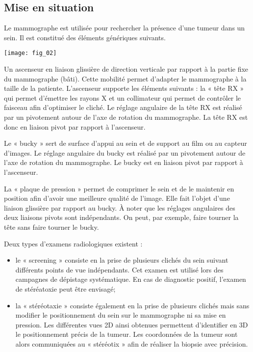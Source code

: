 \begin{multicols}{2}


\section*{Mise en situation}



Le mammographe est utilisée pour rechercher la présence d’une tumeur dans un sein. Il est constitué des éléments génériques suivants.

\begin{center}
\texttt{[image: fig\_02]}
\end{center}


Un ascenseur en liaison glissière de direction verticale par rapport à la partie fixe du mammographe (bâti). Cette mobilité permet d’adapter le mammographe à la taille de la patiente. L’ascenseur supporte les éléments suivants : la « tête RX » qui permet d’émettre les rayons X et un collimateur qui permet de contrôler le faisceau afin d’optimiser le cliché. Le réglage angulaire de la tête RX est réalisé par un pivotement autour de l’axe de rotation du mammographe.
La tête RX est donc en liaison pivot par rapport à l’ascenseur.


Le « bucky » sert de surface d’appui au sein et de support au film ou au capteur
d’images. %
Le réglage angulaire du
bucky est réalisé par un pivotement autour de l’axe de rotation du mammographe.
Le bucky est en liaison pivot par rapport à l’ascenseur.

La « plaque de pression » permet de comprimer le sein et de le maintenir en
position afin d’avoir une meilleure qualité de l’image. Elle fait l’objet d’une
liaison glissière par rapport au bucky.
À noter que les réglages angulaires des deux liaisons
pivots sont indépendants. On peut, par exemple, faire
tourner la tête sans faire tourner le bucky.

Deux types d’examens radiologiques existent :
\begin{itemize}
\item le « screening » consiste en la prise de plusieurs clichés du sein suivant différents points de vue indépendants.
Cet examen est 
utilisé lors des campagnes de dépistage systématique. En cas de diagnostic positif, l’examen de stéréatoxie peut être envisagé;
\item la « stéréotaxie » consiste également en la prise de plusieurs clichés mais sans modifier le positionnement
du sein sur le mammographe ni sa mise en pression. Les différentes vues 2D ainsi obtenues
permettent d’identifier en 3D le positionnement précis de la tumeur. Les coordonnées de la tumeur sont
alors communiquées au « stéréotix » afin de réaliser la biopsie avec précision.
\end{itemize}


\end{multicols}
